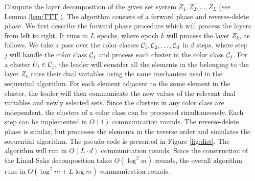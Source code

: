 \documentclass[11pt]{article}
\newcommand{\calC} {{\cal C}}
\begin{document}
Compute the layer decomposition of the given set system $Z_1, Z_2, \ldots, Z_L$ (see Lemma \ref{lem:TTT}).
The algorithm consists of a forward phase and reverse-delete phase.
We first describe the forward phase procedure which will process the layers from left to right.
It runs in $L$ epochs, where epoch $k$ will process the layer $Z_k$, as follows.
We take a pass over the color classes $\calC_1, \calC_2,\ldots, \calC_d$ in $d$ steps,
where step $j$ will handle the color class $\calC_j$ and process each cluster in the color class $\calC_j$.
For a cluster $U_i\in \calC_j$, the leader will consider all the elements in the
belonging to the layer $Z_k$ raise their dual variables using the same mechanism used in the
sequential algorithm. For each element adjacent to the some element in the cluster, 
the leader will then communicate the new values of the relevant dual variables and newly selected sets.
Since the clusters in any color class are independent,
the clusters of a color class can be processed simultaneously.
Each step can be implemented in $O(1)$ communication rounds.
The reverse-delete phase is similar, but processes the elements in the reverse order
and simulates the sequential algorithm.
The pseudo-code is presented in Figure \ref{fig:dist}.
The algorithm will run in $O(L\cdot d)$ communication rounds.
Since the construction of the Linial-Saks decomposition takes $O(\log^2 m)$ rounds,
the overall algorithm runs in $O(\log^2 m + L\log m)$ communication rounds.
\end{document}
